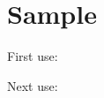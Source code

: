 \documentclass{article}
\begin{document}
\section{Sample}

First use:


Next use:


\printglossaries
\end{document}
